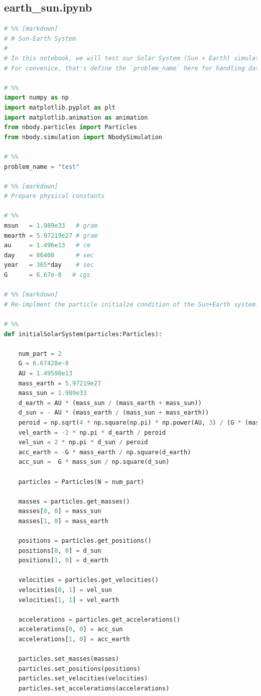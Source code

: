 \documentclass[12pt]{article}
\begin{document}
    \subsection{{\ttfamily earth\_sun.ipynb}}
        \begin{lstlisting}[language={Python}]
# %% [markdown]
# # Sun-Earth System
# 
# In this notebook, we will test our Solar System (Sun + Earth) simulation.\
# For convenice, that's define the `problem_name` here for handling data IO.

# %%
import numpy as np
import matplotlib.pyplot as plt
import matplotlib.animation as animation
from nbody.particles import Particles
from nbody.simulation import NbodySimulation

# %%
problem_name = "test"

# %% [markdown]
# Prepare physical constants

# %%
msun   = 1.989e33   # gram
mearth = 5.97219e27 # gram
au     = 1.496e13   # cm
day    = 86400      # sec
year   = 365*day    # sec
G      = 6.67e-8   # cgs

# %% [markdown]
# Re-implment the particle initialze condition of the Sun+Earth system. 

# %%
def initialSolarSystem(particles:Particles):
    
    num_part = 2
    G = 6.67428e-8
    AU = 1.49598e13
    mass_earth = 5.97219e27
    mass_sun = 1.989e33
    d_earth = AU * (mass_sun / (mass_earth + mass_sun))
    d_sun = - AU * (mass_earth / (mass_sun + mass_earth))
    peroid = np.sqrt(4 * np.square(np.pi) * np.power(AU, 3) / (G * (mass_earth + mass_sun)))
    vel_earth = -2 * np.pi * d_earth / peroid
    vel_sun = 2 * np.pi * d_sun / peroid
    acc_earth = -G * mass_earth / np.square(d_earth)
    acc_sun =  G * mass_sun / np.square(d_sun)

    particles = Particles(N = num_part)
    
    masses = particles.get_masses()
    masses[0, 0] = mass_sun
    masses[1, 0] = mass_earth
    
    positions = particles.get_positions()
    positions[0, 0] = d_sun
    positions[1, 0] = d_earth
    
    velocities = particles.get_velocities()
    velocities[0, 1] = vel_sun
    velocities[1, 1] = vel_earth
    
    accelerations = particles.get_accelerations()
    accelerations[0, 0] = acc_sun
    accelerations[1, 0] = acc_earth
    
    particles.set_masses(masses)
    particles.set_positions(positions)
    particles.set_velocities(velocities)
    particles.set_accelerations(accelerations)
    

\end{lstlisting}
\end{document}
